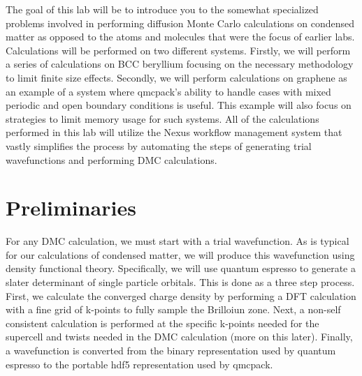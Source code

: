 The goal of this lab will be to introduce you to the somewhat specialized problems involved in performing diffusion Monte Carlo calculations on condensed matter as opposed to the atoms and molecules that were the focus of earlier labs.   Calculations will be performed on two different systems.  Firstly, we will perform a series of calculations on BCC beryllium focusing on the necessary methodology to limit finite size effects.  Secondly, we will perform calculations on graphene as an example of a system where qmcpack’s ability to handle cases with mixed periodic and open boundary conditions is useful.  This example will also focus on strategies to limit memory usage for such systems.
All of the calculations performed in this lab will utilize the Nexus workflow management system that vastly simplifies the process by automating the steps of generating trial wavefunctions and performing DMC calculations.

\newcommand{\vp}{\mathbf{a}^\text{p}}
\newcommand{\vs}{\mathbf{a}^\text{s}} 
\newcommand{\Smat}{\mathbf{S}}
\section{Preliminaries}
For any DMC calculation, we must start with a trial wavefunction. As is typical for our calculations of condensed matter, we will produce this wavefunction using density functional theory.  Specifically, we will use quantum espresso to generate a slater determinant of single particle orbitals.  This is done as a three step process.  First, we calculate the converged charge density by performing a DFT calculation with a fine grid of k-points to fully sample the Brilloiun zone.  Next, a non-self consistent calculation is performed at the specific k-points needed for the supercell and twists needed in the DMC calculation (more on this later).  Finally, a wavefunction is converted from the binary representation used by quantum espresso to the portable hdf5 representation used by qmcpack.

